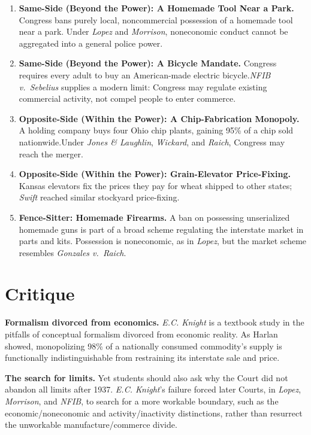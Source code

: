 \documentclass[12pt]{article}
\begin{document}
\begin{enumerate}
\item \textbf{Same-Side (Beyond the Power): A Homemade Tool Near a Park.}  Congress bans purely local, noncommercial possession of a homemade tool near a park. Under \textit{Lopez} and \textit{Morrison}, noneconomic conduct cannot be aggregated into a general police power.
\item \textbf{Same-Side (Beyond the Power): A Bicycle Mandate.} Congress requires every adult to buy an American-made electric bicycle.\textit{NFIB v.\ Sebelius} supplies a modern limit: Congress may regulate existing commercial activity, not compel people to enter commerce.
\item \textbf{Opposite-Side (Within the Power): A Chip-Fabrication Monopoly.} A holding company buys four Ohio chip plants, gaining 95\% of a chip sold nationwide.Under \textit{Jones \& Laughlin}, \textit{Wickard}, and \textit{Raich}, Congress may reach the merger.
\item \textbf{Opposite-Side (Within the Power): Grain-Elevator Price-Fixing.} Kansas elevators fix the prices they pay for wheat shipped to other states; \textit{Swift} reached similar stockyard price-fixing.
\item \textbf{Fence-Sitter: Homemade Firearms.} A ban on possessing unserialized homemade guns is part of a broad scheme regulating the interstate market in parts and kits. Possession is noneconomic, as in \textit{Lopez}, but the market scheme resembles \textit{Gonzales v.\ Raich}.
\end{enumerate}

\section{Critique}

\textbf{Formalism divorced from economics.} \textit{E.C. Knight} is a textbook study in the pitfalls of conceptual formalism divorced from economic reality. As Harlan showed, monopolizing 98\% of a nationally consumed commodity's supply is functionally indistinguishable from restraining its interstate sale and price.

\textbf{The search for limits.} Yet students should also ask why the Court did not abandon all limits after 1937. \textit{E.C. Knight}'s failure forced later Courts, in \textit{Lopez}, \textit{Morrison}, and \textit{NFIB}, to search for a more workable boundary, such as the economic/noneconomic and activity/inactivity distinctions, rather than resurrect the unworkable manufacture/commerce divide.
\end{document}

